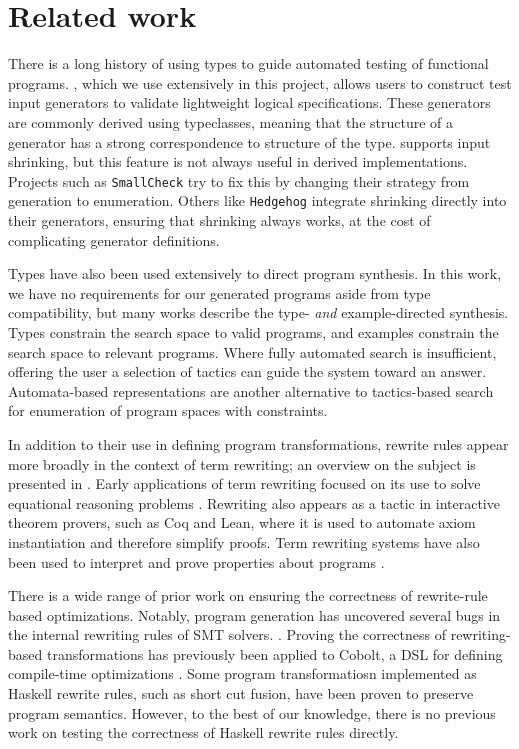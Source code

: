 \section{Related work}
\label{sec:related}

There is a long history of using types to guide automated testing of functional programs. \Quickcheck \cite{claessen2000quickcheck}, which we use extensively in this project, allows users to construct test input generators to validate lightweight logical specifications. These generators are commonly derived using typeclasses, meaning that the structure of a generator has a strong correspondence to structure of the type. \Quickcheck supports input shrinking, but this feature is not always useful in derived implementations. Projects such as \texttt{SmallCheck} \cite{runciman2008smallcheck} try to fix this by changing their strategy from generation to enumeration. Others like \texttt{Hedgehog} \cite{hedgehog} integrate shrinking directly into their generators, ensuring that shrinking always works, at the cost of complicating generator definitions.

Types have also been used extensively to direct program synthesis. In this work, we have no requirements for our generated programs aside from type compatibility, but many works describe the type- \textit{and} example-directed synthesis. \cite{osera2015type, feser2015synthesizing} Types constrain the search space to valid programs, and examples constrain the search space to relevant programs. Where fully automated search is insufficient, offering the user a selection of tactics can guide the system toward an answer. \cite{delahaye2000tactic} Automata-based representations \cite{koppel2022searching} are another alternative to tactics-based search for enumeration of program spaces with constraints.

In addition to their use in defining program transformations, rewrite rules
appear more broadly in the context of term rewriting; an overview on the subject
is presented in \cite{klop1990term}. Early applications of term rewriting
focused on its use to solve equational reasoning problems
\cite{knuth1983simple}. Rewriting also appears as a tactic in interactive
theorem provers, such as Coq\cite{coq} and Lean\cite{lean}, where it is used to
automate axiom instantiation and therefore simplify proofs. Term rewriting
systems have also been used to interpret and prove properties about programs
\cite{Dershowitz1985ComputingWR}.

There is a wide range of prior work on ensuring the correctness of rewrite-rule
based optimizations. Notably, program generation has uncovered several bugs in
the internal rewriting rules of SMT solvers. \cite{winterer2020validating}.
Proving the correctness of rewriting-based transformations has previously been
applied to Cobolt, a DSL for defining compile-time optimizations
\cite{lerner2003automatically}. Some program transformatiosn implemented as
Haskell rewrite rules, such as short cut fusion\cite{shortcutfusion}, have been
proven to preserve program semantics\cite{johann2003short}. However, to the best
of our knowledge, there is no previous work on testing the correctness of
Haskell rewrite rules directly.

